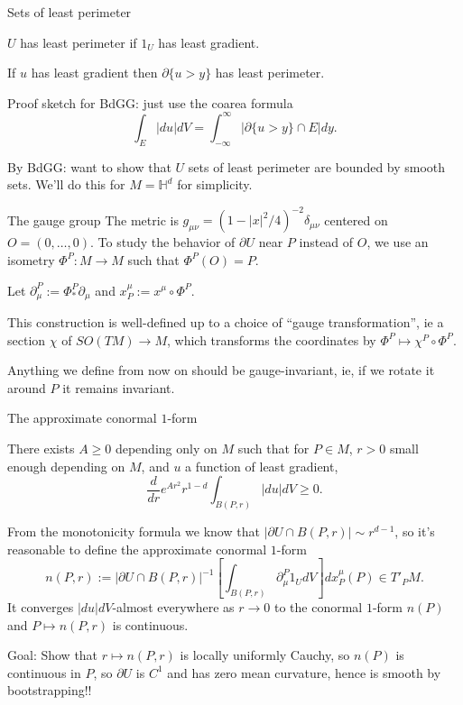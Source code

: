 \documentclass[10pt]{beamer}
\begin{document}
\begin{frame}{Sets of least perimeter}
\begin{definition}
$U$ has least perimeter if $1_U$ has least gradient.
\end{definition}\pause

\begin{theorem}
    If $u$ has least gradient then $\partial \{u > y\}$ has least perimeter.
\end{theorem}\pause

Proof sketch for BdGG: just use the coarea formula 
$$\int_E |du|dV = \int_{-\infty}^\infty |\partial \{u > y\} \cap E| dy.$$
\pause

By BdGG: want to show that $U$ sets of least perimeter are bounded by smooth sets. We'll do this for $M = \mathbb H^d$ for simplicity.
\end{frame}

\begin{frame}{The gauge group}
    The metric is $g_{\mu\nu} = (1 - |x|^2/4)^{-2} \delta_{\mu\nu}$ centered on $O = (0, \dots, 0)$.
To study the behavior of $\partial U$ near $P$ instead of $O$, we use an isometry $\Phi^P: M \to M$ such that $\Phi^P(O) = P$.\pause

Let $\partial_\mu^P := \Phi^P_* \partial_\mu$ and $x_P^\mu := x^\mu \circ \Phi^P$.\pause

This construction is well-defined up to a choice of ``gauge transformation'', ie a section $\chi$ of $SO(TM) \to M$, which transforms the coordinates by $\Phi^P \mapsto \chi^P \circ \Phi^P$.\pause

Anything we define from now on should be gauge-invariant, ie, if we rotate it around $P$ it remains invariant.
\end{frame}

\begin{frame}{The approximate conormal $1$-form}
\begin{theorem}
    There exists $A \geq 0$ depending only on $M$ such that for $P \in M$, $r > 0$ small enough depending on $M$, and $u$ a function of least gradient,
    $$\frac{d}{dr} e^{Ar^2} r^{1 - d} \int_{B(P, r)} |du|dV \geq 0.$$
\end{theorem}\pause

From the monotonicity formula we know that $|\partial U \cap B(P, r)| \sim r^{d - 1}$, so it's reasonable to define the approximate conormal $1$-form 
$$n(P, r) := |\partial U \cap B(P, r)|^{-1} \left[\int_{B(P, r)} \partial_\mu^P 1_U dV\right] dx^\mu_P(P) \in T'_P M.$$\pause
It converges $|du|dV$-almost everywhere as $r \to 0$ to the conormal $1$-form $n(P)$ and $P \mapsto n(P, r)$ is continuous.

\pause Goal: Show that $r \mapsto n(P, r)$ is locally uniformly Cauchy, so $n(P)$ is continuous in $P$, so $\partial U$ is $C^1$ and has zero mean curvature, hence is smooth by bootstrapping!!
\end{frame}
\end{document}
